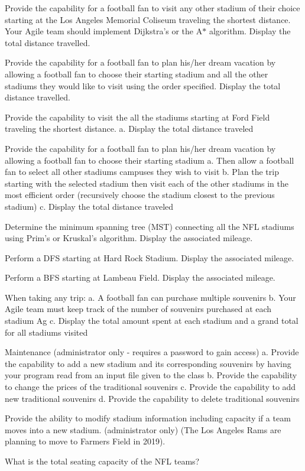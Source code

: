 \begin{DoxyEnumerate}
\item Provide the capability for a football fan to visit any other stadium of their choice starting at the Los Angeles Memorial Coliseum traveling the shortest distance. Your Agile team should implement Dijkstra’s or the A$\ast$ algorithm. Display the total distance travelled.
\item Provide the capability for a football fan to plan his/her dream vacation by allowing a football fan to choose their starting stadium and all the other stadiums they would like to visit using the order specified. Display the total distance travelled.
\item Provide the capability to visit the all the stadiums starting at Ford Field traveling the shortest distance. a. Display the total distance traveled
\item Provide the capability for a football fan to plan his/her dream vacation by allowing a football fan to choose their starting stadium a. Then allow a football fan to select all other stadiums campuses they wish to visit b. Plan the trip starting with the selected stadium then visit each of the other stadiums in the most efficient order (recursively choose the stadium closest to the previous stadium) c. Display the total distance traveled
\item Determine the minimum spanning tree (M\+ST) connecting all the N\+FL stadiums using Prim’s or Kruskal’s algorithm. Display the associated mileage.
\item Perform a D\+FS starting at Hard Rock Stadium. Display the associated mileage.
\item Perform a B\+FS starting at Lambeau Field. Display the associated mileage.
\item When taking any trip\+: a. A football fan can purchase multiple souvenirs b. Your Agile team must keep track of the number of souvenirs purchased at each stadium Ag c. Display the total amount spent at each stadium and a grand total for all stadiums visited
\item Maintenance (administrator only -\/ requires a password to gain access) a. Provide the capability to add a new stadium and its corresponding souvenirs by having your program read from an input file given to the class b. Provide the capability to change the prices of the traditional souvenirs c. Provide the capability to add new traditional souvenirs d. Provide the capability to delete traditional souvenirs
\item Provide the ability to modify stadium information including capacity if a team moves into a new stadium. (administrator only) (The Los Angeles Rams are planning to move to Farmers Field in 2019).
\item What is the total seating capacity of the N\+FL teams? 
\end{DoxyEnumerate}